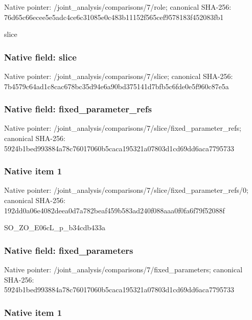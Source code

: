 \documentclass[10pt,a4paper]{article}
\begin{document}
Native pointer: /joint\_analysis/comparisons/7/role; canonical SHA-256: 76d65c66ecee5e5adc4ce6c3\allowbreak{}1085e0c483b11152f565cef9\allowbreak{}578183f452083fb1


slice


\subsubsection{Native field: slice}


Native pointer: /joint\_analysis/comparisons/7/slice; canonical SHA-256: 7b4579c64ad1c8cac678bc35\allowbreak{}d94e6a90bd375141d7bfb5c6\allowbreak{}fde0e5f960c87e5a



\subsubsection{Native field: fixed\_parameter\_refs}


Native pointer: /joint\_analysis/comparis\allowbreak{}ons/7/slice/fixed\_parame\allowbreak{}ter\_refs; canonical SHA-256: 5924b1bed993884a78c76017\allowbreak{}060b5caca195321a07803d1c\allowbreak{}d69dd6aca7795733



\subsubsection{Native item 1}


Native pointer: /joint\_analysis/comparis\allowbreak{}ons/7/slice/fixed\_parame\allowbreak{}ter\_refs/0; canonical SHA-256: 192dd0a06e4082deea0d7a78\allowbreak{}2beaf459b583ad240f088aaa\allowbreak{}0f0fa6f79f52088f


SO\_ZO\_E06cL\_p\_b34cdb433a


\subsubsection{Native field: fixed\_parameters}


Native pointer: /joint\_analysis/comparis\allowbreak{}ons/7/fixed\_parameters; canonical SHA-256: 5924b1bed993884a78c76017\allowbreak{}060b5caca195321a07803d1c\allowbreak{}d69dd6aca7795733



\subsubsection{Native item 1}
\end{document}

